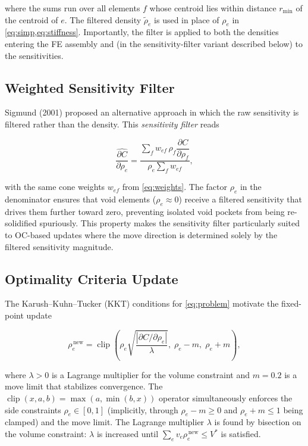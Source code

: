 \documentclass[11pt,a4paper]{article}
\begin{document}
\noindent where the sums run over all elements $f$ whose centroid lies
within distance $r_\mathrm{min}$ of the centroid of $e$.  The filtered
density $\tilde{\rho}_e$ is used in place of $\rho_e$ in
\cref{eq:simp,eq:stiffness}.  Importantly, the filter is applied to both
the densities entering the FE assembly and (in the sensitivity-filter
variant described below) to the sensitivities.

\subsection{Weighted Sensitivity Filter}
\label{sec:sens_filter}

Sigmund (2001) proposed an alternative approach in which the raw
sensitivity is filtered rather than the density.  This \emph{sensitivity
filter} reads

\begin{equation}
  \widehat{\frac{\partial C}{\partial \rho_e}}
  = \frac{\displaystyle\sum_{f} w_{ef}\,\rho_f
           \dfrac{\partial C}{\partial \rho_f}}
         {\rho_e \displaystyle\sum_{f} w_{ef}},
  \label{eq:sensitivity_filter}
\end{equation}

\noindent with the same cone weights $w_{ef}$ from \cref{eq:weights}.  The
factor $\rho_e$ in the denominator ensures that void elements ($\rho_e
\approx 0$) receive a filtered sensitivity that drives them further toward
zero, preventing isolated void pockets from being re-solidified spuriously.
This property makes the sensitivity filter particularly suited to OC-based
updates where the move direction is determined solely by the filtered
sensitivity magnitude.

\subsection{Optimality Criteria Update}
\label{sec:oc}

The Karush--Kuhn--Tucker (KKT) conditions for \cref{eq:problem} motivate
the fixed-point update

\begin{equation}
  \rho_e^{\,\mathrm{new}}
  = \operatorname{clip}\!\left(
      \rho_e \sqrt{\frac{\left|\partial C / \partial \rho_e\right|}{\lambda}},
      \;\rho_e - m,\;
      \rho_e + m
    \right),
  \label{eq:oc_update}
\end{equation}

\noindent where $\lambda > 0$ is a Lagrange multiplier for the volume
constraint and $m = 0.2$ is a move limit that stabilizes convergence.  The
$\operatorname{clip}(x, a, b) = \max(a, \min(b, x))$ operator simultaneously
enforces the side constraints $\rho_e \in [0, 1]$ (implicitly, through
$\rho_e - m \geq 0$ and $\rho_e + m \leq 1$ being clamped) and the move
limit.  The Lagrange multiplier $\lambda$ is found by bisection on the
volume constraint: $\lambda$ is increased until $\sum_e v_e \rho_e^{\,\mathrm{new}}
\leq V^*$ is satisfied.
\end{document}
